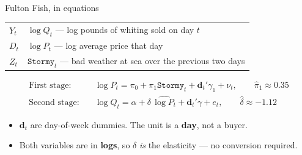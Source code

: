 \documentclass[
  11pt,
  ignorenonframetext,
  aspectratio=169,
]{beamer}
\providecommand{\tightlist}{%
  \setlength{\itemsep}{0pt}\setlength{\parskip}{0pt}}
\begin{document}
\begin{frame}{Fulton Fish, in equations}
\protect{}\label{fulton-fish-in-equations}
\begin{center}\small
\begin{tabular}{ll}
\toprule
$Y_t$ & $\log Q_t$ --- log pounds of whiting sold on day $t$ \\
$D_t$ & $\log P_t$ --- log average price that day \\
$Z_t$ & $\texttt{Stormy}_t$ --- bad weather at sea over the previous two days \\
\bottomrule
\end{tabular}
\end{center}

\vspace{-0.3em}

\begin{align*}
\text{First stage:}\quad & \log P_t = \pi_0 + \pi_1 \texttt{Stormy}_t + \mathbf{d}_t'\gamma_1 + \nu_t, \qquad \hat\pi_1 \approx 0.35 \\
\text{Second stage:}\quad & \log Q_t = \alpha + \delta\, \widehat{\log P_t} + \mathbf{d}_t'\gamma + e_t, \qquad \hat\delta \approx -1.12
\end{align*}

\vspace{-0.3em}

\begin{itemize}
\tightlist
\item
  \(\mathbf{d}_t\) are day-of-week dummies. The unit is a \textbf{day},
  not a buyer.
\item
  Both variables are in \textbf{logs}, so \(\delta\) \emph{is} the
  elasticity --- no conversion required.
\end{itemize}
\end{frame}
\end{document}
